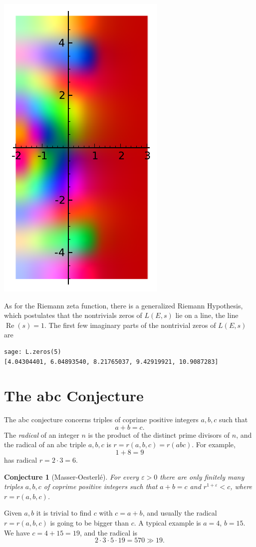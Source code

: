 \documentclass{book}
\theoremstyle{plain}
\newtheorem{conjecture}[theorem]{Conjecture}
\theoremstyle{definition}
\numberwithin{equation}{section}
\numberwithin{figure}{section}
\numberwithin{table}{section}
\DeclareMathOperator{\realpart}{Re}
\renewcommand{\Re}{\realpart}
\newcommand{\eps}{\varepsilon}
\begin{document}
\begin{center}
\includegraphics[width=.4\textwidth]{pics/27a-lser1.pdf}
\end{center}

As for the Riemann zeta function, there is a generalized Riemann
Hypothesis, which postulates that the nontrivials zeros of
$L(E,s)$ lie on a line, the line $\Re(s)=1$.
The first few imaginary parts of the nontrivial zeros of $L(E,s)$ are
\begin{lstlisting}
sage: L.zeros(5)
[4.04304401, 6.04893540, 8.21765037, 9.42919921, 10.9087283]
\end{lstlisting}


\section{The abc Conjecture}
The abc conjecture
concerns triples of coprime positive integers $a,b,c$  such that
$$
a+b = c.
$$
The {\em radical} of an integer $n$ is the product
of the distinct prime divisors of $n$, and the radical
of an abc triple $a,b,c$ is $r=r(a,b,c)=r(abc)$.
For example,
$$
  1 + 8 = 9
$$
has radical $r=2\cdot 3=6$.

\begin{conjecture}[Masser-Oesterl\'{e}]\label{conj:abc}
For every $\eps>0$ there are only finitely many
triples $a,b,c$ of coprime positive integers such
that $a+b=c$ and $r^{1+\eps}<c$,
where $r=r(a,b,c)$.
\end{conjecture}

Given $a,b$ it is trivial to find $c$ with $c=a+b$, and
usually the radical $r=r(a,b,c)$ is going to be bigger
than $c$.   A typical example is $a=4$, $b=15$.
We have $c=4+15=19$, and the radical is
$$2\cdot 3\cdot5\cdot19=570 \gg 19.$$
\end{document}
